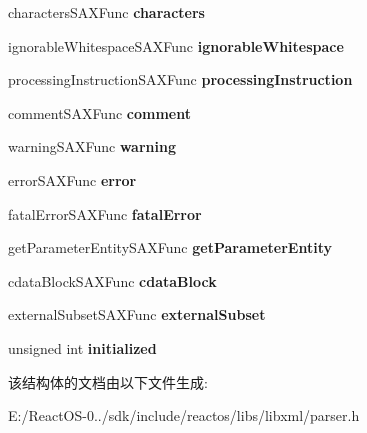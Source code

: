 \begin{DoxyCompactItemize}
characters\+S\+A\+X\+Func {\bfseries characters}
\item 
\mbox{\label{struct__xml_s_a_x_handler_v1_a0d25157139fc3e99e67f0a126dee5d5c}} 
ignorable\+Whitespace\+S\+A\+X\+Func {\bfseries ignorable\+Whitespace}
\item 
\mbox{\label{struct__xml_s_a_x_handler_v1_a2d98ad46baa0f1a03ccca433e7541f65}} 
processing\+Instruction\+S\+A\+X\+Func {\bfseries processing\+Instruction}
\item 
\mbox{\label{struct__xml_s_a_x_handler_v1_a0100dbc90526989b6ef1786d27253f3e}} 
comment\+S\+A\+X\+Func {\bfseries comment}
\item 
\mbox{\label{struct__xml_s_a_x_handler_v1_abd9b23cf8beef529266afe74e9e82dbf}} 
warning\+S\+A\+X\+Func {\bfseries warning}
\item 
\mbox{\label{struct__xml_s_a_x_handler_v1_a944f9de403a5740bf219129523e49130}} 
error\+S\+A\+X\+Func {\bfseries error}
\item 
\mbox{\label{struct__xml_s_a_x_handler_v1_a5b6797dbc24c30062a216c8d9da10ce8}} 
fatal\+Error\+S\+A\+X\+Func {\bfseries fatal\+Error}
\item 
\mbox{\label{struct__xml_s_a_x_handler_v1_a3fa7627b54df41f9b7c4ffc56acf5093}} 
get\+Parameter\+Entity\+S\+A\+X\+Func {\bfseries get\+Parameter\+Entity}
\item 
\mbox{\label{struct__xml_s_a_x_handler_v1_a98acb685255099ea411bec6ba59aa3b1}} 
cdata\+Block\+S\+A\+X\+Func {\bfseries cdata\+Block}
\item 
\mbox{\label{struct__xml_s_a_x_handler_v1_abed7b7b3c670bd6dceeffaf9ed7ea91d}} 
external\+Subset\+S\+A\+X\+Func {\bfseries external\+Subset}
\item 
\mbox{\label{struct__xml_s_a_x_handler_v1_aeed93655a47b1ea5c82a540b5843fa79}} 
unsigned int {\bfseries initialized}
\end{DoxyCompactItemize}


该结构体的文档由以下文件生成\+:\begin{DoxyCompactItemize}
\item 
E\+:/\+React\+O\+S-\/0../sdk/include/reactos/libs/libxml/parser.\+h\end{DoxyCompactItemize}
